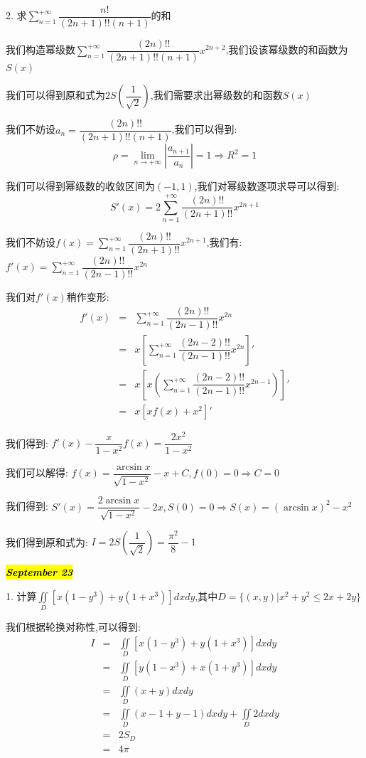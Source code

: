 2. 求$\sum\limits_{n=1}^{+\infty}\dfrac{n!}{(2n+1)!!(n+1)}$的和
\begin{solution}

	我们构造幂级数$\sum\limits_{n=1}^{+\infty}\dfrac{(2n)!!}{(2n+1)!!(n+1)}x^{2n+2}$,我们设该幂级数的和函数为$S(x)$
	
	我们可以得到原和式为$2S(\dfrac{1}{\sqrt{2}})$,我们需要求出幂级数的和函数$S(x)$
	
	我们不妨设$a_{n}=\dfrac{(2n)!!}{(2n+1)!!(n+1)}$,我们可以得到:  
	$$\rho=\lim\limits_{n\rightarrow +\infty}|\dfrac{a_{n+1}}{a_{n}}|=1\Rightarrow R^2=1$$
	
	我们可以得到幂级数的收敛区间为$(-1,1)$,我们对幂级数逐项求导可以得到:  
	$$S'(x)=2\sum\limits_{n=1}^{+\infty}\dfrac{(2n)!!}{(2n+1)!!}x^{2n+1}$$
	
	我们不妨设$f(x)=\sum\limits_{n=1}^{+\infty}\dfrac{(2n)!!}{(2n+1)!!}x^{2n+1}$,我们有:  $f'(x)=\sum\limits_{n=1}^{+\infty}\dfrac{(2n)!!}{(2n-1)!!}x^{2n}$
	
	我们对$f'(x)$稍作变形:  
	\begin{eqnarray*}
		f'(x)&=&\sum\limits_{n=1}^{+\infty}\dfrac{(2n)!!}{(2n-1)!!}x^{2n}\\
		&=&x\left[\sum\limits_{n=1}^{+\infty}\dfrac{(2n-2)!!}{(2n-1)!!}x^{2n} \right]'\\
		&=&x\left[ x\left(\sum\limits_{n=1}^{+\infty}\dfrac{(2n-2)!!}{(2n-1)!!}x^{2n-1} \right) \right]'\\
		&=&x\left[ xf(x)+x^2\right]'   
	\end{eqnarray*}

	我们得到:  $f'(x)-\dfrac{x}{1-x^2}f(x)=\dfrac{2x^2}{1-x^2}$
	
	我们可以解得:  $f(x)=\dfrac{\arcsin x}{\sqrt{1-x^2}}-x+C,f(0)=0\Rightarrow C=0$
	
	我们得到:  $S'(x)=\dfrac{2\arcsin x}{\sqrt{1-x^2}}-2x,S(0)=0\Rightarrow S(x)=(\arcsin x)^2-x^2$
	
	我们得到原和式为:  $I=2S(\dfrac{1}{\sqrt{2}})=\dfrac{\pi^2}{8}-1$
\end{solution}

\hl{\textbf{\textit{September 23}}}

1. 计算$\iint\limits_{D}\left[ x(1-y^3)+y(1+x^3)\right]dxdy$,其中$D=\{(x,y)|x^2+y^2\leq 2x+2y\}$
\begin{solution}

	我们根据轮换对称性,可以得到:
	\begin{eqnarray*}
		I&=&\iint\limits_{D}\left[ x(1-y^3)+y(1+x^3)\right]dxdy\\
		&=&\iint\limits_{D}\left[ y(1-x^3)+x(1+y^3)\right]dxdy\\
		&=&\iint\limits_{D}(x+y)dxdy\\
		&=&\iint\limits_{D}(x-1+y-1)dxdy+\iint\limits_{D}2dxdy\\
		&=&2S_{D}\\
		&=&4\pi
	\end{eqnarray*}
\end{solution}

